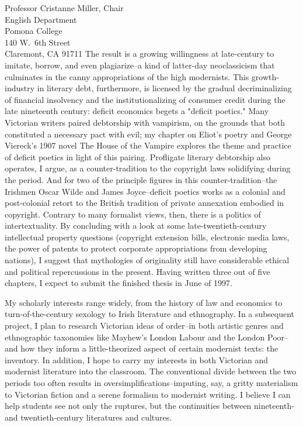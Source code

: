 \documentclass[11pt,draft]{mtletter}
\begin{document}
\begin{letter}{%
Professor Cristanne Miller, Chair \\
English Department \\
Pomona College \\
140 W.~6th Street \\
Claremont, CA 91711
}
The result is a growing willingness at late-century to imitate, borrow, and even plagiarize--a kind of latter-day neoclassicism that culminates in the canny appropriations of the high modernists. This growth-industry in literary debt, furthermore, is licensed by the gradual decriminalizing of financial insolvency and the institutionalizing of consumer credit during the late nineteenth century: deficit economics begets a "deficit poetics." Many Victorian writers paired debtorship with vampirism, on the grounds that both constituted a necessary pact with evil; my chapter on Eliot's poetry and George Viereck's 1907 novel The House of the Vampire explores the theme and practice of deficit poetics in light of this pairing. Profligate literary debtorship also operates, I argue, as a counter-tradition to the copyright laws solidifying during the period. And for two of the principle figures in this counter-tradition--the Irishmen Oscar Wilde and James Joyce--deficit poetics works as a colonial and post-colonial retort to the British tradition of private annexation embodied in copyright. Contrary to many formalist views, then, there is a politics of intertextuality. By concluding with a look at some late-twentieth-century intellectual property questions (copyright extension bills, electronic media laws, the power of patents to protect corporate appropriations from developing nations), I suggest that mythologies of originality still have considerable ethical and political repercussions in the present. Having written three out of five chapters, I expect to submit the finished thesis in June of 1997.

My scholarly interests range widely, from the history of law and economics to turn-of-the-century sexology to Irish literature and ethnography. In a subsequent project, I plan to research Victorian ideas of order--in both artistic genres and ethnographic taxonomies like Mayhew's London Labour and the London Poor--and how they inform a little-theorized aspect of certain modernist texts: the inventory. In addition, I hope to carry my interests in both Victorian and modernist literature into the classroom. The conventional divide between the two periods too often results in oversimplifications--imputing, say, a gritty materialism to Victorian fiction and a serene formalism to modernist writing. I believe I can help students see not only the ruptures, but the continuities between nineteenth- and twentieth-century literatures and cultures.


\end{letter}
\end{document}
